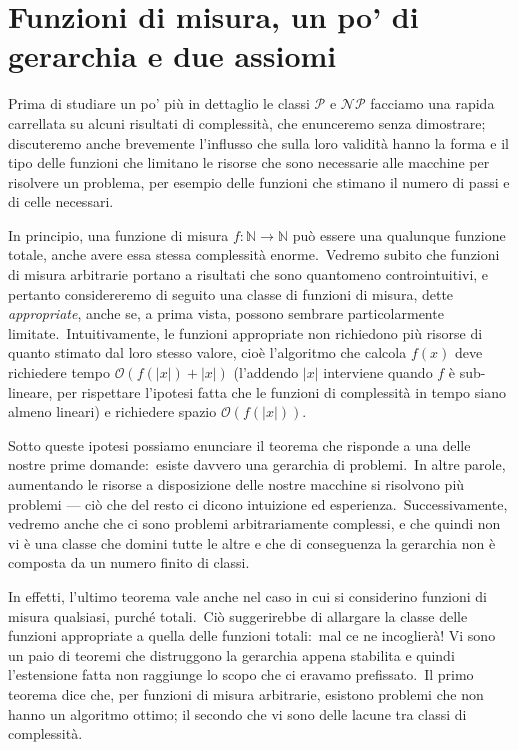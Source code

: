 \section{Funzioni di misura, un po' di gerarchia e due assiomi}

Prima di studiare un po' più in dettaglio le classi $\mathcal{P}$ e $\mathcal{NP}$ facciamo una rapida carrellata su alcuni risultati di complessità, che enunceremo senza dimostrare; discuteremo anche brevemente l'influsso che sulla loro validità hanno la forma e il tipo delle funzioni che limitano le risorse che sono necessarie alle macchine per risolvere un problema, per esempio delle funzioni che stimano il numero di passi e di celle necessari.\

In principio, una funzione di misura $f : \mathbb{N} \rightarrow \mathbb{N}$ può essere una qualunque funzione totale, anche avere essa stessa complessità enorme.\
Vedremo subito che funzioni di misura arbitrarie portano a risultati che sono quantomeno controintuitivi, e pertanto considereremo di seguito una classe di funzioni di misura, dette \textit{appropriate}, anche se, a prima vista, possono sembrare particolarmente limitate.\
Intuitivamente, le funzioni appropriate non richiedono più risorse di quanto stimato dal loro stesso valore, cioè l'algoritmo che calcola $f(x)$ deve richiedere tempo $\mathcal{O}(f(|x|) + |x|)$ (l'addendo $|x|$ interviene quando $f$ è sub-lineare, per rispettare l'ipotesi fatta che le funzioni di complessità in tempo siano almeno lineari) e richiedere spazio $\mathcal{O}(f(|x|))$.\

Sotto queste ipotesi possiamo enunciare il teorema che risponde a una delle nostre prime domande:\ esiste davvero una gerarchia di problemi.\
In altre parole, aumentando le risorse a disposizione delle nostre macchine si risolvono più problemi --- ciò che del resto ci dicono intuizione ed esperienza.\
Successivamente, vedremo anche che ci sono problemi arbitrariamente complessi, e che quindi non vi è una classe che domini tutte le altre e che di conseguenza la gerarchia non è composta da un numero finito di classi.\

In effetti, l'ultimo teorema vale anche nel caso in cui si considerino funzioni di misura qualsiasi, purché totali.\
Ciò suggerirebbe di allargare la classe delle funzioni appropriate a quella delle funzioni totali:\ mal ce ne incoglierà! Vi sono un paio di teoremi che distruggono la gerarchia appena stabilita e quindi l'estensione fatta non raggiunge lo scopo che ci eravamo prefissato.\
Il primo teorema dice che, per funzioni di misura arbitrarie, esistono problemi che non hanno un algoritmo ottimo; il secondo che vi sono delle lacune tra classi di complessità.\

